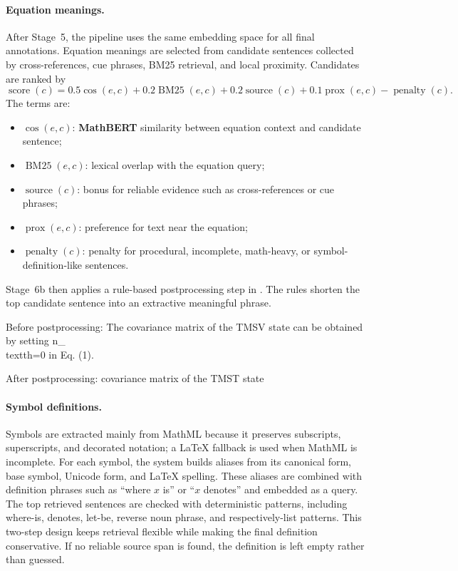 \documentclass[11pt]{article}
\begin{document}
\paragraph{Equation meanings.}
After Stage~5, the pipeline uses the same embedding space for all final
annotations.  Equation meanings are selected from candidate sentences
collected by cross-references, cue phrases, BM25 retrieval, and local
proximity.  Candidates are ranked by
\[
\operatorname{score}(c)=0.5\cos(e,c)+0.2\operatorname{BM25}(e,c)
+0.2\operatorname{source}(c)+0.1\operatorname{prox}(e,c)-\operatorname{penalty}(c).
\]
The terms are:
\begin{itemize}
  \item $\cos(e,c)$: \textbf{MathBERT} similarity between equation
        context and candidate sentence;
  \item $\operatorname{BM25}(e,c)$: lexical overlap with the equation
        query;
  \item $\operatorname{source}(c)$: bonus for reliable evidence such as
        cross-references or cue phrases;
  \item $\operatorname{prox}(e,c)$: preference for text near the
        equation;
  \item $\operatorname{penalty}(c)$: penalty for procedural,
        incomplete, math-heavy, or symbol-definition-like sentences.
\end{itemize}


Stage~6b then applies a rule-based postprocessing step in
.
The rules shorten the top candidate sentence into an extractive
meaningful phrase.

\begin{CodeSnippet}
Before postprocessing:
The covariance matrix of the TMSV state can be obtained by setting
n_{\\text{th}}=0 in Eq. (1).

After postprocessing:
covariance matrix of the TMST state
\end{CodeSnippet}

\paragraph{Symbol definitions.}
Symbols are extracted mainly from MathML because it preserves subscripts,
superscripts, and decorated notation; a \LaTeX{} fallback is used when
MathML is incomplete.  For each symbol, the system builds aliases from
its canonical form, base symbol, Unicode form, and \LaTeX{} spelling.
These aliases are combined with definition phrases such as ``where $x$
is'' or ``$x$ denotes'' and embedded as a query.  The top retrieved
sentences are checked with deterministic patterns, including where-is,
denotes, let-be, reverse noun phrase, and respectively-list patterns.
This two-step design keeps retrieval flexible while making the final
definition conservative.  If no reliable source span is found, the
definition is left empty rather than guessed.
\end{document}
